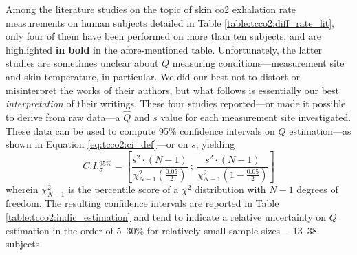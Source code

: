 Among the literature studies on the topic of skin \gls{co2} exhalation rate measurements on human subjects detailed in Table \ref{table:tcco2:diff_rate_lit}, only four of them have been performed on more than ten subjects, and are highlighted \textbf{in bold} in the afore-mentioned table. Unfortunately, the latter studies are sometimes unclear about $Q$ measuring conditions---measurement site and skin temperature, in particular. We did our best not to distort or misinterpret the works of their authors, but what follows is essentially our best \emph{interpretation} of their writings. These four studies reported---or made it possible to derive from raw data---a $\widehat{Q}$ and $s$ value for each measurement site investigated. These data can be used to compute 95\% confidence intervals on $Q$ estimation---as shown in Equation \ref{eq:tcco2:ci_def}---or on $s$, yielding \cite[Chap.~4]{ambrosius2007topics}
\begin{equation}\label{eq:tcco2:sigma_ci}
	C.I._{\sigma}^{95\%} = \left[ \frac{s^2 \cdot (N-1)}{\chi^2_{N-1}\left(\frac{0.05}{2}\right)} \ ; \ \frac{s^2 \cdot (N-1)}{\chi^2_{N-1}\left(1 - \frac{0.05}{2}\right)} \right]
\end{equation}
wherein $\chi^2_{N-1}$ is the percentile score of a $\chi^2$ distribution with $N-1$ degrees of freedom. The resulting confidence intervals are reported in Table \ref{table:tcco2:indic_estimation} and tend to indicate a relative uncertainty on $Q$ estimation in the order of 5--30\% for relatively small sample sizes---\ie{} 13--38 subjects.


